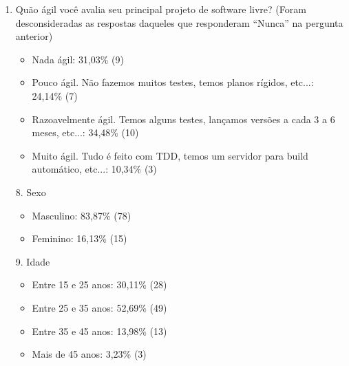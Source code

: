 \begin{enumerate}
\item Quão ágil você avalia seu principal projeto de software livre?
  (Foram desconsideradas as respostas daqueles que responderam
  ``Nunca'' na pergunta anterior)
  \begin{itemize}
  \item Nada ágil: 31,03\% (9)
  \item Pouco ágil. Não fazemos muitos testes, temos planos rígidos,
    etc...: 24,14\% (7)
  \item Razoavelmente ágil. Temos alguns testes, lançamos versões a
    cada 3 a 6 meses, etc...: 34,48\% (10)
  \item Muito ágil. Tudo é feito com TDD, temos um servidor para build
    automático, etc...: 10,34\% (3)
  \end{itemize}

\item[8.] Sexo
  \begin{itemize}
  \item Masculino: 83,87\% (78)
  \item Feminino: 16,13\% (15)
  \end{itemize}

\item[9.] Idade
  \begin{itemize}
  \item Entre 15 e 25 anos: 30,11\% (28)
  \item Entre 25 e 35 anos: 52,69\% (49)
  \item Entre 35 e 45 anos: 13,98\% (13)
  \item Mais de 45 anos: 3,23\% (3)
  \end{itemize}
\end{enumerate}
